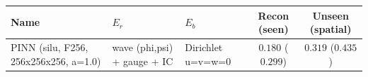 \begin{center}
\begin{tabular}{lll cc}
\toprule
Name & $E_r$ & $E_b$ & Recon (seen) & Unseen (spatial) \\
\midrule
PINN (silu, F256, 256x256x256, a=1.0) & wave (phi,psi) + gauge + IC & Dirichlet u=v=w=0 & $0.180$ ($0.299$) & $0.319$ ($0.435$) \\
\bottomrule
\end{tabular}
\end{center}
